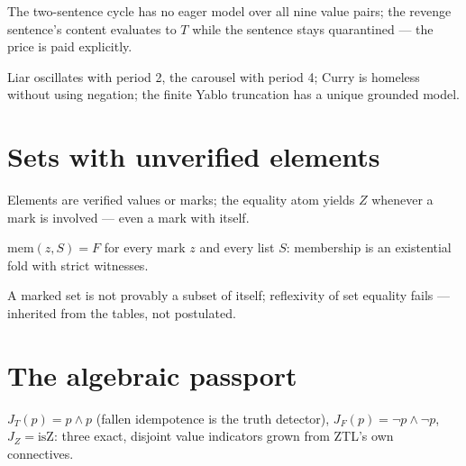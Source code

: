 \begin{theorem}\label{thm:carousel}
  \leanok
  The two-sentence cycle has no eager model over all nine value pairs;
  the revenge sentence's content evaluates to $T$ while the sentence
  stays quarantined --- the price is paid explicitly.
\end{theorem}

\begin{theorem}[Dynamics]\label{thm:dynamics}
  \leanok
  Liar oscillates with period 2, the carousel with period 4; Curry is
  homeless without using negation; the finite Yablo truncation has a
  unique grounded model.
\end{theorem}

\chapter{Sets with unverified elements}

\begin{definition}\label{def:el}
  \leanok
  Elements are verified values or marks; the equality atom yields $Z$
  whenever a mark is involved --- even a mark with itself.
\end{definition}

\begin{theorem}\label{thm:memz}
  \leanok
  $\mathrm{mem}(z, S)=F$ for every mark $z$ and every list $S$:
  membership is an existential fold with strict witnesses.
\end{theorem}

\begin{theorem}\label{thm:marked}
  \leanok
  A marked set is not provably a subset of itself; reflexivity of set
  equality fails --- inherited from the tables, not postulated.
\end{theorem}

\chapter{The algebraic passport}

\begin{definition}[J-operators]\label{def:jops}
  \leanok
  $J_T(p) = p\wedge p$ (fallen idempotence is the truth detector),
  $J_F(p) = \neg p\wedge\neg p$, $J_Z = \mathrm{isZ}$: three exact,
  disjoint value indicators grown from ZTL's own connectives.
\end{definition}


